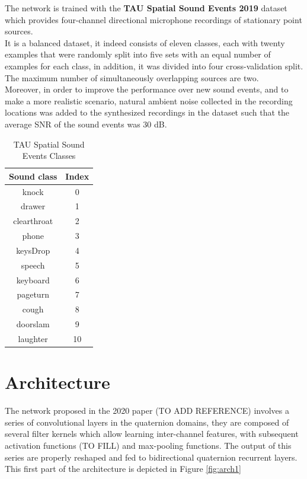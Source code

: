 \documentclass[11pt]{article}
\begin{document}
The network is trained with the \textbf{TAU Spatial Sound Events 2019} dataset which provides four-channel directional microphone recordings of stationary point sources.\\
It is a balanced dataset, it indeed consists of eleven classes, each with twenty examples that were randomly split into five sets with an equal number of examples for each class, in addition, it was divided into four cross-validation split.\\
The maximum number of simultaneously overlapping sources are two.\\
Moreover, in order to improve the performance over new sound events, and to make a more realistic scenario, natural ambient noise collected in the recording locations was added to the synthesized recordings in the dataset such that the average SNR of the sound events was 30 dB.

\begin{table}[ht]
	\caption{TAU Spatial Sound Events Classes}
	\centering
	\begin{tabular}{c c}
		\hline\hline
		Sound class & Index \\ [0.5ex]
		\hline
		knock & 0 \\
		drawer & 1 \\
		clearthroat & 2 \\
		phone & 3 \\
		keysDrop & 4 \\
		speech & 5 \\
		keyboard & 6 \\
		pageturn & 7 \\
		cough & 8 \\
		doorslam & 9 \\
		laughter & 10\\
		\hline		
	\end{tabular}
	\label{table:classes}
\end{table}

\newpage
\section{Architecture}\label{cha:arch}

The network proposed in the 2020 paper (TO ADD REFERENCE) involves a series of convolutional layers in the quaternion domains, they are composed of several filter kernels which allow learning inter-channel features, with subsequent activation functions (TO FILL) and max-pooling functions. The output of this series are properly reshaped and fed to bidirectional quaternion recurrent layers. This first part of the architecture is depicted in Figure \ref{fig:arch1}
\end{document}
